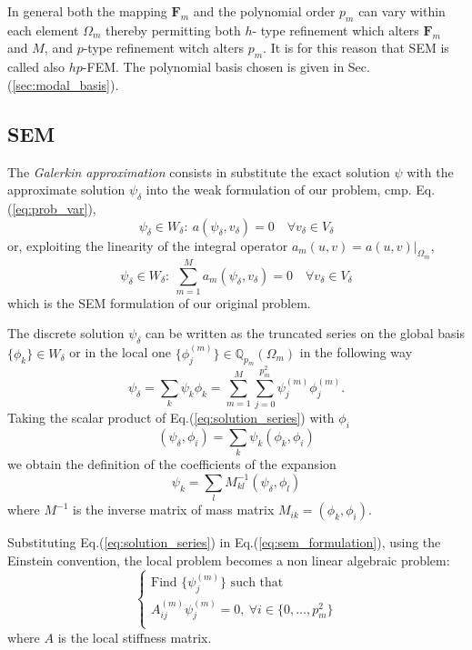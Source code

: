 In general both the mapping $\mathbf{F}_m$ and the polynomial order $p_m$  can vary within each element $\Omega_m$ thereby permitting both $h$- type refinement which alters $\mathbf{F}_m$ and $M$, and $p$-type refinement witch alters $p_m$. It is for this reason that SEM is called also $hp$-FEM. The polynomial basis chosen is given in Sec.(\ref{sec:modal_basis}).

\subsection{SEM}
The \textit{Galerkin approximation} consists in substitute the exact solution $\psi$ with the approximate solution $\psi_{\delta}$ into the weak formulation of our problem, cmp. Eq.(\ref{eq:prob_var}),
\begin{equation}
 \psi_\delta\in W_\delta:\: a(\psi_\delta,v_\delta)=0\quad\forall v_\delta\in V_\delta
\end{equation}
or, exploiting the linearity of the integral operator $a_m(u,v)=a(u,v)|_{\Omega_m}$,
\begin{equation}\label{eq:sem_formulation}
 \psi_\delta\in W_\delta:\: \sum_{m=1}^M a_m(\psi_\delta,v_\delta)=0\quad\forall v_\delta\in V_\delta
\end{equation}
which is the SEM formulation of our original problem.
\medskip

The discrete solution $\psi_{\delta}$ can be written as the truncated series on the global basis $\{\phi_k\}\in W_{\delta}$ or in the local one $\{\phi_j^{(m)}\}\in\mathbb{Q}_{p_m}(\Omega_m)$ in the following way
\begin{equation}\label{eq:solution_series}
  \psi_\delta=\sum_k \psi_k \phi_k=\sum_{m=1}^{M} \sum_{j=0}^{p^2_m} \psi^{(m)}_j \phi_j^{(m)}.
\end{equation}
Taking the scalar product of Eq.(\ref{eq:solution_series}) with $\phi_i$
\begin{equation}
  (\psi_\delta,\phi_i)=\sum_k \psi_k (\phi_k,\phi_i)
\end{equation}
we obtain the definition of the coefficients of the expansion
\begin{equation}\label{eq:expansion_coeff}
 \psi_k=\sum_l M^{-1}_{kl}(\psi_\delta,\phi_l)
\end{equation}
where $M^{-1}$ is the inverse matrix of mass matrix $M_{ik}=(\phi_k,\phi_i)$.
\medskip

Substituting Eq.(\ref{eq:solution_series}) in Eq.(\ref{eq:sem_formulation}), using the Einstein convention, the local problem becomes a non linear algebraic problem:
\begin{equation}\label{eq:algebraic_system}
  \left\{\begin{array}{ll}\textrm{Find $\{\psi^{(m)}_j\}$ such that}\\
  \textrm{$A^{(m)}_{ij} \psi_j^{(m)}=0,\:\forall i\in\{0,\dots,p^2_m\}$}\\
\end{array}\right.
\end{equation}
where $A$ is the local stiffness matrix.

